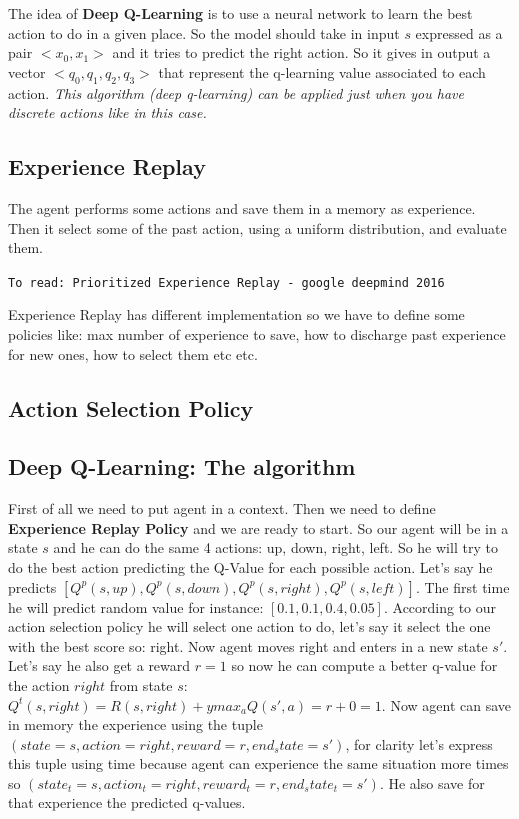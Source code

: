 The idea of \textbf{Deep Q-Learning} is to use a neural network to learn the best action to do in a given place. So the model should take in input $s$ expressed as a pair $<x_0, x_1>$ and it tries to predict the right action. So it gives in output a vector $<q_0, q_1, q_2, q_3>$ that represent the q-learning value associated to each action. \textit{This algorithm (deep q-learning) can be applied just when you have discrete actions like in this case.}

\subsection{Experience Replay}

The agent performs some actions and save them in a memory as experience. Then it select some of the past action, using a uniform distribution, and evaluate them. 

\texttt{To read: Prioritized Experience Replay - google deepmind 2016}

Experience Replay has different implementation so we have to define some policies like: max number of experience to save, how to discharge past experience for new ones, how to select them etc etc. 

\subsection{Action Selection Policy}

\subsection{Deep Q-Learning: The algorithm}

First of all we need to put agent in a context. Then we need to define \textbf{Experience Replay Policy} and we are ready to start. So our agent will be in a state $s$ and he can do the same 4 actions: up, down, right, left. So he will try to do the best action predicting the Q-Value for each possible action. Let's say he predicts $[Q^p(s,up), Q^p(s,down), Q^p(s,right),Q^p(s,left)]$. The first time he will predict random value for instance: $[0.1, 0.1, 0.4, 0.05]$. According to our action selection policy he will select one action to do, let's say it select the one with the best score so: right. Now agent moves right and enters in a new state $s'$. Let's say he also get a reward $r = 1$ so now he can compute a better q-value for the action $right$ from state $s$: $Q^t(s,right) = R(s, right) + ymax_aQ(s', a) = r + 0 = 1$. Now agent can save in memory the experience using the tuple $(state = s, action = right, reward = r, end_state = s')$, for clarity let's express this tuple using time because agent can experience the same situation more times so  $(state_t = s, action_t = right, reward_t = r, end_state_t = s')$. He also save for that experience the predicted q-values.


